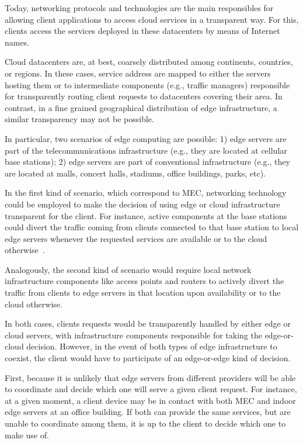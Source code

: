 Today, networking protocols and technologies are the main responsibles for allowing client applications to access cloud services in a transparent way. For this, clients access the services deployed in these datacenters by means of Internet names. 

Cloud datacenters are, at best, coarsely distributed among continents, countries, or regions. In these cases, service address are mapped to either the servers hosting them or to intermediate components (e.g., traffic managers) responsible for transparently routing client requests to datacenters covering their area. In contrast, in a fine grained geographical distribution of edge infrastructure, a similar transparency may not be possible. 

In particular, two scenarios of edge computing are possible: 1) edge servers are part of the telecommunications infrastructure (e.g., they are located at cellular base stations); 2) edge servers are part of conventional infrastructure  (e.g., they are located at malls, concert halls, stadiums, office buildings, parks, etc). 

In the first kind of scenario, which correspond to MEC, networking technology could be employed to make the decision of using edge or cloud infrastructure transparent for the client. For instance, active components at the base stations could divert the traffic coming from clients connected to that base station to local edge servers whenever the requested services are available or to the cloud otherwise~\cite{MEC_ROUTING}. 

Analogously, the second kind of scenario would require local network infrastructure components like access points and routers to actively divert the traffic from clients to edge servers in that location upon availability or to the cloud otherwise.

In both cases, clients requests would be transparently handled by either edge or cloud servers, with infrastructure components responsible for taking the edge-or-cloud decision. However, in the event of both types of edge infrastructure to coexist, the client would have to participate of an edge-or-edge kind of decision.

First, because it is unlikely that edge servers from different providers will be able to coordinate and decide which one will serve a given client request. For instance, at a given moment, a client device may be in contact with both MEC and indoor edge servers at an office building. If both can provide the same services, but are unable to coordinate among them, it is up to the client to decide which one to make use of. 

